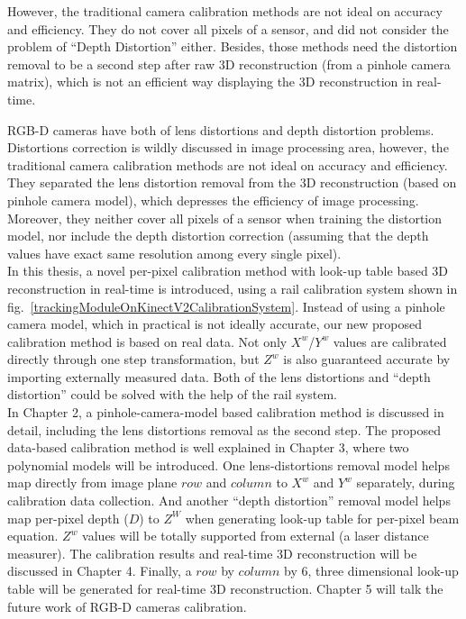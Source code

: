  However, the traditional camera calibration methods are not ideal on accuracy and efficiency. They do not cover all pixels of a sensor, and did not consider the problem of \enquote{Depth Distortion} either. Besides, those methods need the distortion removal to be a second step after raw 3D reconstruction (from a pinhole camera matrix), which is not an efficient way displaying the 3D reconstruction in real-time.


RGB-D cameras have both of lens distortions and depth distortion problems. Distortions correction is wildly discussed in image processing area, however, the traditional camera calibration methods are not ideal on accuracy and efficiency. They separated the lens distortion removal from the 3D reconstruction (based on pinhole camera model), which depresses the efficiency of image processing. Moreover, they neither cover all pixels of a sensor when training the distortion model, nor include the depth distortion correction (assuming that the depth values have exact same resolution among every single pixel).%
\\\indent
In this thesis, a novel per-pixel calibration method with look-up table based 3D reconstruction in real-time is introduced, using a rail calibration system shown in fig.~\ref{trackingModuleOnKinectV2CalibrationSystem}. Instead of using a pinhole camera model, which in practical is not ideally accurate, our new proposed calibration method is based on real data. Not only \(X^w\)/\(Y^w\) values are calibrated directly through one step transformation, but \(Z^w\) is also guaranteed accurate by importing externally measured data. Both of the lens distortions and \enquote{depth distortion} could be solved with the help of the rail system.
\\\indent
In Chapter 2, a pinhole-camera-model based calibration method is discussed in detail, including the lens distortions removal as the second step. The proposed data-based calibration method is well explained in Chapter 3, where two polynomial models will be introduced. One lens-distortions removal model helps map directly from image plane \(row\) and \(column\) to \(X^{w}\) and \(Y^{w}\) separately, during calibration data collection. And another \enquote{depth distortion} removal model helps map per-pixel depth (\(D\)) to \(Z^W\) when generating look-up table for per-pixel beam equation. \(Z^{w}\) values will be totally supported from external (a laser distance measurer). The calibration results and real-time 3D reconstruction will be discussed in Chapter 4. Finally, a \(row\) by \(column\) by 6, three dimensional look-up table will be generated for real-time 3D reconstruction. Chapter 5 will talk the future work of RGB-D cameras calibration.
%
%
%
%
%
%
%





